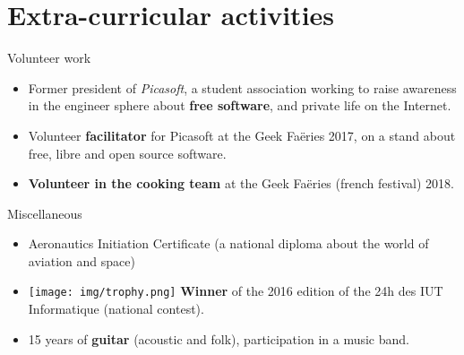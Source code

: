 \documentclass[a4paper]{twentysecondcv} %
\begin{document}
\section{Extra-curricular activities}
\begin{twenty}
    \twentyitem
    	{}
		{}
        {Volunteer work}
        {}
        {}
        {\begin{itemize}
        \item Former president of \textit{Picasoft}, a student association working to raise awareness in the engineer sphere about \textbf{free software}, and private life on the Internet.
        \item Volunteer \textbf{facilitator} for Picasoft at the Geek Faëries 2017, on a stand about free, libre and open source software.
        \item \textbf{Volunteer in the cooking team} at the Geek Faëries (french festival) 2018.
        \end{itemize}}
    \twentyitem
        {}
                {}
        {Miscellaneous}
        {}
        {}
        {\begin{itemize}
        \item Aeronautics Initiation Certificate (a national diploma about the world of aviation and space)
        \item \texttt{[image: img/trophy.png]} \textbf{Winner} of the 2016 edition of the 24h des IUT Informatique (national contest).
        \item 15 years of \textbf{guitar} (acoustic and folk), participation in a music band.
        \end{itemize}}
\end{twenty}
\end{document}
